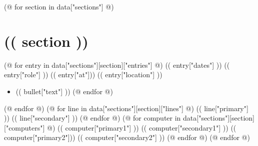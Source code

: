 \documentclass[11pt,color,letterpaper,sans]{moderncv}
\begin{document}
\maketitle

(@ for section in data["sections"] @)
  \section{(( section ))}
  (@ for entry in data["sections"][section]["entries"] @)
    \cventry
      {(( entry["dates"] ))}
      {(( entry["role"] ))}
      {(( entry["at"])) }
      {(( entry["location"] ))}
      {}
      {
        \begin{itemize}
        (@ for bullet in entry["bullets"] @) \item (( bullet["text"] )) (@ endfor @)
        \end{itemize}
      }
  (@ endfor @)
  (@ for line in data["sections"][section]["lines"] @)
    \cvline
      {(( line["primary"] ))}
      {(( line["secondary"] ))}
  (@ endfor @)
  (@ for computer in data["sections"][section]["computers"] @)
    \cvcomputer
      {(( computer["primary1"] ))}
      {(( computer["secondary1"] ))}
      {(( computer["primary2"])) }
      {(( computer["secondary2"] ))}
  (@ endfor @)
(@ endfor @)
\end{document}
